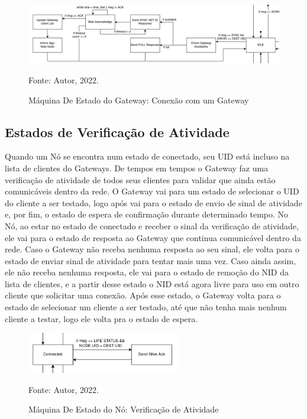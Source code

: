 \begin{figure}[htp]
    \centering
	\caption{Máquina De Estado do Gateway: Conexão com um Gateway}
    \includegraphics[width=\textwidth]{img/gw-connect.drawio.png}
    
    Fonte: Autor, 2022.
    \label{fig:fsm-gw-connect}
\end{figure}

\newpage

\subsection{Estados de Verificação de Atividade}

Quando um Nó se encontra num estado de conectado, seu UID está
incluso na lista de clientes do Gateways. De tempos em tempos
o Gateway faz uma verificação de atividade de todos seus clientes
para validar que ainda estão comunicáveis dentro da rede. O Gateway
vai para um estado de selecionar o UID do cliente a ser testado,
logo após vai para o estado de envio de sinal de atividade e, por fim,
o estado de espera de confirmação durante determinado tempo.
No Nó, ao estar no estado de conectado
e receber o sinal da verificação de atividade, ele vai para o estado
de resposta ao Gateway que continua comunicável dentro da rede.
Caso o Gateway não receba nenhuma resposta ao seu sinal, ele volta
para o estado de enviar sinal de atividade para tentar mais uma vez.
Caso ainda assim, ele não receba nenhuma resposta, ele vai para o
estado de remoção do NID da lista de clientes, e a partir desse estado
o NID está agora livre para uso em outro cliente que solicitar uma
conexão. Após esse estado, o Gateway volta para o estado de selecionar
um cliente a ser testado, até que não tenha mais nenhum cliente a
testar, logo ele volta pra o estado de espera.

\begin{figure}[htp]
    \centering
	\caption{Máquina De Estado do Nó: Verificação de Atividade}
    \includegraphics[width=0.6\textwidth]{img/node-alive.drawio.png}
    
    Fonte: Autor, 2022.
    \label{fig:fsm-node-alive}
\end{figure}

